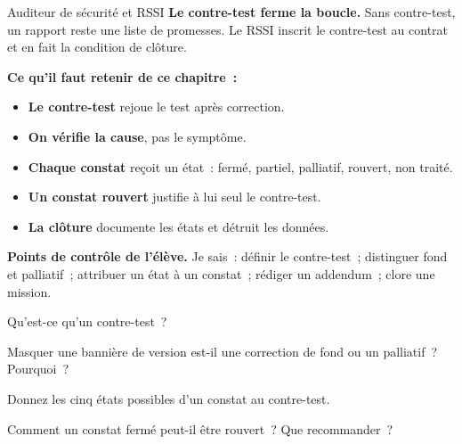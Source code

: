 \begin{boxmetier}{Auditeur de sécurité et RSSI}
\textbf{Le contre-test ferme la boucle.} Sans contre-test, un rapport reste
une liste de promesses. Le RSSI inscrit le contre-test au contrat et en fait
la condition de clôture.
\end{boxmetier}

\separateur

\begin{boxresume}
\textbf{Ce qu'il faut retenir de ce chapitre~:}
\begin{itemize}
    \item \textbf{Le contre-test} rejoue le test après correction.
    \item \textbf{On vérifie la cause}, pas le symptôme.
    \item \textbf{Chaque constat} reçoit un état~: fermé, partiel, palliatif,
          rouvert, non traité.
    \item \textbf{Un constat rouvert} justifie à lui seul le contre-test.
    \item \textbf{La clôture} documente les états et détruit les données.
\end{itemize}
\end{boxresume}

\begin{boxinfo}
\textbf{Points de contrôle de l'élève.} Je sais~: définir le contre-test~;
distinguer fond et palliatif~; attribuer un état à un constat~; rédiger un
addendum~; clore une mission.
\end{boxinfo}

\bigskip

\begin{boxexo}[title={\ding{45}\quad Exercice~23.1. Définition \niveaubase}]
Qu'est-ce qu'un contre-test~?
\end{boxexo}

\begin{boxexo}[title={\ding{45}\quad Exercice~23.2. Fond ou palliatif \niveaubase}]
Masquer une bannière de version est-il une correction de fond ou un
palliatif~? Pourquoi~?
\end{boxexo}

\begin{boxexo}[title={\ding{45}\quad Exercice~23.3. États \niveaubase}]
Donnez les cinq états possibles d'un constat au contre-test.
\end{boxexo}

\begin{boxexo}[title={\ding{45}\quad Exercice~23.4. T-10 rouvert \niveaumoyen}]
Comment un constat fermé peut-il être rouvert~? Que recommander~?
\end{boxexo}


